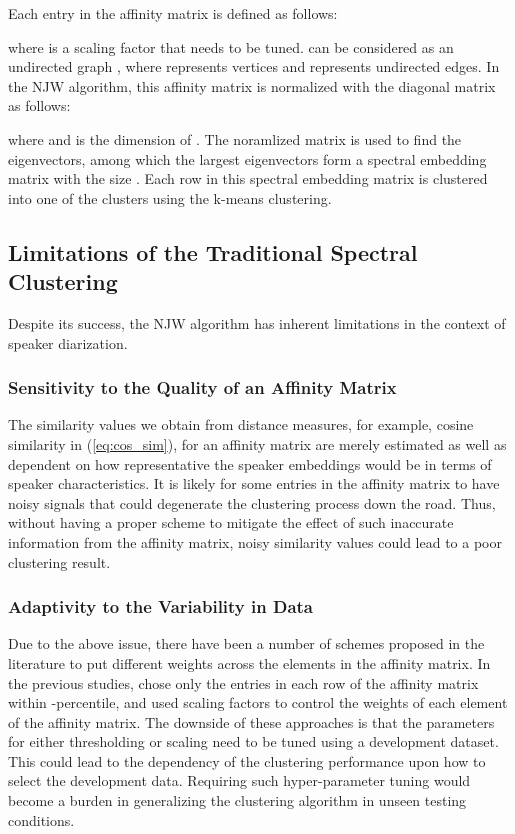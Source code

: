 \documentclass[journal]{IEEEtran}
\begin{document}
Each entry in the affinity matrix  is defined as follows:

where  is a scaling factor that needs to be tuned.  can be considered as an undirected graph , where  represents vertices and  represents undirected edges. In the NJW algorithm, this affinity matrix  is normalized with the diagonal matrix  as follows:

where  and  is the dimension of . The noramlized matrix  is used to find the eigenvectors, among which the  largest eigenvectors form a spectral embedding matrix with the size . Each row in this spectral embedding matrix is clustered into one of the  clusters using the k-means clustering. 
\vspace{-1ex}
\subsection{Limitations of the Traditional Spectral Clustering}

Despite its success, the NJW algorithm has inherent limitations in the context of speaker diarization. 
\subsubsection{Sensitivity to the Quality of an Affinity Matrix} 
The similarity values we obtain from distance measures, for example, cosine similarity in (\ref{eq:cos_sim}), for an affinity matrix are merely estimated as well as dependent on how representative the speaker embeddings would be in terms of speaker characteristics. It is likely for some entries in the affinity matrix to have noisy signals that could degenerate the clustering process down the road. Thus, without having a proper scheme to mitigate the effect of such inaccurate information from the affinity matrix, noisy similarity values could lead to a poor clustering result.

\subsubsection{Adaptivity to the Variability in Data} Due to the above issue, there have been a number of schemes proposed in the literature to put different weights across the elements in the affinity matrix. In the previous studies, \cite{wang2018speaker} chose only the entries in each row of the affinity matrix within -percentile, and \cite{ning2006spectral, shum2012use} used scaling factors to control the weights of each element of the affinity matrix. The downside of these approaches is that the parameters for either thresholding or scaling need to be tuned using a development dataset. This could lead to the dependency of the clustering performance upon how to select the development data. Requiring such hyper-parameter tuning would become a burden in generalizing the clustering algorithm in unseen testing conditions. 
\vspace{-1.0ex}
\end{document}
